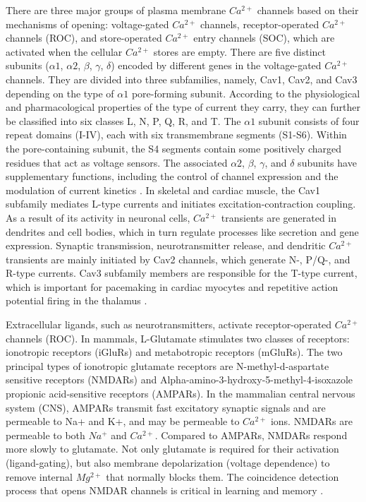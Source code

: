 There are three major groups of plasma membrane $Ca^{2+}$ channels based on their mechanisms of opening: voltage-gated $Ca^{2+}$ channels, receptor-operated $Ca^{2+}$ channels (ROC), and store-operated $Ca^{2+}$ entry channels (SOC), which are activated when the cellular $Ca^{2+}$ stores are empty. There are five distinct subunits ($\alpha 1$, $\alpha 2$, $\beta$, $\gamma$, $\delta$) encoded by different genes in the voltage-gated $Ca^{2+}$ channels. They are divided into three subfamilies, namely, Cav1, Cav2, and Cav3 depending on the type of $\alpha 1$ pore-forming subunit. According to the physiological and pharmacological properties of the type of current they carry, they can further be classified into six classes L, N, P, Q, R, and T. The $\alpha 1$ subunit consists of four repeat domains (I-IV), each with six transmembrane segments (S1-S6). Within the pore-containing subunit, the S4 segments contain some positively charged residues that act as voltage sensors. The associated $\alpha 2$, $\beta$, $\gamma$, and $\delta$ subunits have supplementary functions, including the control of channel expression and the modulation of current kinetics \parencite{Hofmann1999, Catterall2000}. In skeletal and cardiac muscle, the Cav1 subfamily mediates L-type currents and initiates excitation-contraction coupling. As a result of its activity in neuronal cells, $Ca^{2+}$ transients are generated in dendrites and cell bodies, which in turn regulate processes like secretion and gene expression. Synaptic transmission, neurotransmitter release, and dendritic $Ca^{2+}$ transients are mainly initiated by Cav2 channels, which generate N-, P/Q-, and R-type currents. Cav3 subfamily members are responsible for the T-type current, which is important for pacemaking in cardiac myocytes and repetitive action potential firing in the thalamus \parencite{Catterall2011}.

Extracellular ligands, such as neurotransmitters, activate receptor-operated $Ca^{2+}$ channels (ROC). In mammals, L-Glutamate stimulates two classes of receptors: ionotropic receptors (iGluRs) and metabotropic receptors (mGluRs). The two principal types of ionotropic glutamate receptors are N-methyl-d-aspartate sensitive receptors (NMDARs) and Alpha-amino-3-hydroxy-5-methyl-4-isoxazole propionic acid-sensitive receptors (AMPARs). In the mammalian central nervous system (CNS), AMPARs transmit fast excitatory synaptic signals and are permeable to Na+ and K+, and may be permeable to $Ca^{2+}$ ions. NMDARs are permeable to both $Na^{+}$ and $Ca^{2+}$. Compared to AMPARs, NMDARs respond more slowly to glutamate. Not only glutamate is required for their activation (ligand-gating), but also membrane depolarization (voltage dependence) to remove internal $Mg^{2+}$ that normally blocks them. The coincidence detection process that opens NMDAR channels is critical in learning and memory \parencite{Miyashita2012}.

